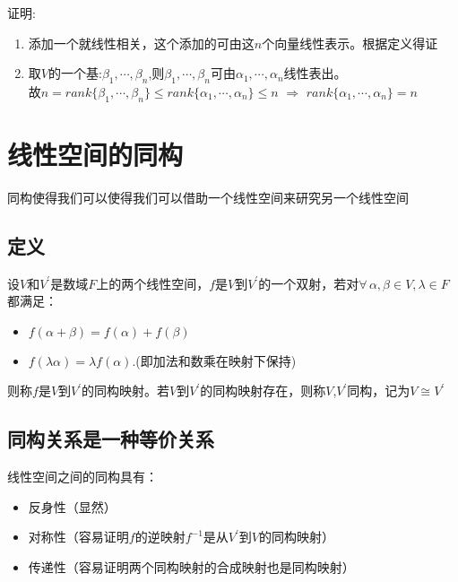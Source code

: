 证明:
\begin{enumerate}
    \item 添加一个就线性相关，这个添加的可由这$n$个向量线性表示。根据定义得证
    \item 取$V$的一个基:$\beta_1, \cdots, \beta_n$,则$\beta_1, \cdots, \beta_n$可由$\alpha_1, \cdots, \alpha_n$线性表出。\\
    故$n = rank\{\beta_1, \cdots, \beta_n\} \leq rank\{\alpha_1, \cdots, \alpha_n\} \leq n$ $\Rightarrow$ $rank\{\alpha_1, \cdots, \alpha_n\} = n$
\end{enumerate}


\section{线性空间的同构}
同构使得我们可以使得我们可以借助一个线性空间来研究另一个线性空间

\subsection*{定义}
\begin{definition}
    设$V$和$V^{'}$是数域$F$上的两个线性空间，$f$是$V$到$V^{'}$的一个双射，若对$\forall \, \alpha, \beta \in V, \lambda \in F$都满足：
    \begin{itemize}
        \item $f(\alpha + \beta) = f(\alpha) + f(\beta)$
        \item $f(\lambda \alpha) = \lambda f(\alpha)$.(即加法和数乘在映射下保持)
    \end{itemize}
    则称$f$是$V$到$V^{'}$的同构映射。若$V$到$V^{'}$的同构映射存在，则称$V$,$V^{'}$同构，记为$V \cong V^{'}$
\end{definition}

\subsection*{同构关系是一种等价关系}
线性空间之间的同构具有：
\begin{itemize}
    \item 反身性（显然）
    \item 对称性（容易证明$f$的逆映射$f^{-1}$是从$V^{'}$到$V$的同构映射）
    \item 传递性（容易证明两个同构映射的合成映射也是同构映射）
\end{itemize}

